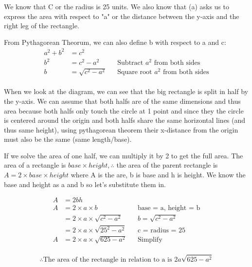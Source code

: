 \documentclass[12pt]{book}
\begin{document}
\begin{enumerate}

\vspace{0.3cm}
We know that C or the radius is 25 units. We also know that (a) 
asks us to express the area with respect to "a" or the distance 
between the y-axis and the right leg of the rectangle.

From Pythagorean Theorum, we can also define b with respect to a and c:
\begin{align*}
    a^2 + b^2 &= c^2 \\
    b^2 &= c^2 - a^2 && \text{Subtract } a^2 \text{ from both sides}\\
    b &= \sqrt{c^2 - a^2} && \text{Square root } a^2 \text{ from both sides}\\
\end{align*}

\vspace{-0.5cm}
When we look at the diagram, we can see that the big rectangle is split in 
half by the y-axis. We can assume that both halfs are of the same dimensions 
and thus area because both halfs only touch the circle at 1 point and since 
they the circle is centered around the origin and both halfs share the same 
horizontal lines (and thus same height), using pythagorean theorem their 
x-distance from the origin must also be the same (same length/base).

\vspace{0.3cm}
If we solve the area of one half, we can multiply it by 2 to get the full area. 
The area of a rectangle is $base \times height, \therefore$ the area of the parent rectangle 
is $A = 2\times base \times height$ where A is the are, b is base and h is height. We know the base and height as a and b 
so let's substitute them in. 

\begin{align*}
    A &= 2bh \\
    A &= 2\times a \times b && \text{base = a, height = b} \\
    &= 2\times a \times \sqrt{c^2 - a^2} && b = \sqrt{c^2 - a^2} \\
    &= 2\times a \times \sqrt{25^2 - a^2} && \text{c = radius = 25} \\
    A &= 2\times a \times \sqrt{625 - a^2} && \text{Simplify} \\
\end{align*}

\vspace{-1cm}
$$\boxed{\therefore \text{The area of the rectangle in relation to a is } 2a\sqrt{625 - a^2}}$$


\end{enumerate}
\end{document}
